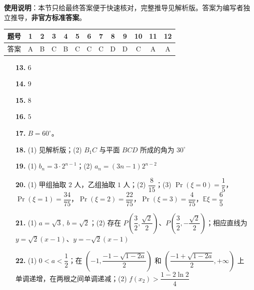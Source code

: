 
\begin{gknotice}
\textbf{使用说明}：本节只给最终答案便于快速核对，完整推导见解析版。答案为编写者独立推导，\textbf{非官方标准答案}。
\end{gknotice}

\begin{center}\begin{tabular}{ccccccccccccc}
\toprule
题号 & 1 & 2 & 3 & 4 & 5 & 6 & 7 & 8 & 9 & 10 & 11 & 12 \\
\midrule
答案 & A & B & C & B & C & C & C & D & D & C & A & A \\
\bottomrule
\end{tabular}\end{center}

\begin{itemize}[leftmargin=2.6em]
  \item[\textbf{13.}] $6$
  \item[\textbf{14.}] $9$
  \item[\textbf{15.}] $8$
  \item[\textbf{16.}] $5$
\end{itemize}

\begin{itemize}[leftmargin=2.6em]
  \item[\textbf{17.}] $B=60^\circ$。
  \item[\textbf{18.}] (1) 见解析版；(2) $B_1C$ 与平面 $BCD$ 所成的角为 $30^\circ$
  \item[\textbf{19.}] (1) $b_n=3\cdot2^{n-1}$；(2) $a_n=(3n-1)2^{n-2}$
  \item[\textbf{20.}] (1) 甲组抽取 $2$ 人，乙组抽取 $1$ 人；(2) $\dfrac8{15}$；(3) $\Pr(\xi=0)=\dfrac15$，$\Pr(\xi=1)=\dfrac{34}{75}$，$\Pr(\xi=2)=\dfrac{22}{75}$，$\Pr(\xi=3)=\dfrac4{75}$，$\mathbb E\xi=\dfrac65$
  \item[\textbf{21.}] (1) $a=\sqrt3,\ b=\sqrt2$；(2) 存在 $P\left(\dfrac32,\dfrac{\sqrt2}{2}\right)$、$P\left(\dfrac32,-\dfrac{\sqrt2}{2}\right)$；相应直线为 $y=\sqrt2(x-1)$、$y=-\sqrt2(x-1)$
  \item[\textbf{22.}] (1) $0<a<\dfrac12$；在 $\left(-1,\dfrac{-1-\sqrt{1-2a}}2\right)$ 和 $\left(\dfrac{-1+\sqrt{1-2a}}2,+\infty\right)$ 上单调递增，在两根之间单调递减；(2) $f(x_2)>\dfrac{1-2\ln2}{4}$
\end{itemize}
